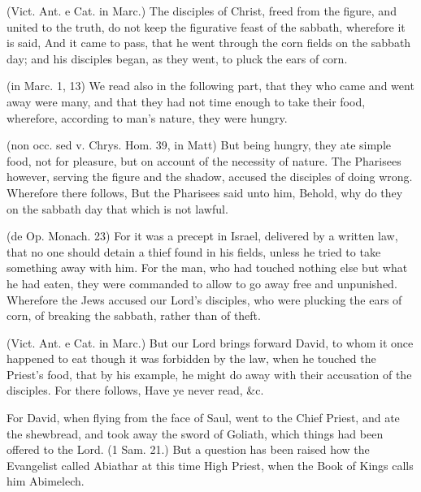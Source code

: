  (Vict. Ant. e Cat. in Marc.) The disciples of Christ, freed from the figure, and united to the truth, do not keep the figurative feast of the sabbath, wherefore it is said, And it came to pass, that he went through the corn fields on the sabbath day; and his disciples began, as they went, to pluck the ears of corn.

 (in Marc. 1, 13) We read also in the following part, that they who came and went away were many, and that they had not time enough to take their food, wherefore, according to man’s nature, they were hungry.

 (non occ. sed v. Chrys. Hom. 39, in Matt) But being hungry, they ate simple food, not for pleasure, but on account of the necessity of nature. The Pharisees however, serving the figure and the shadow, accused the disciples of doing wrong. Wherefore there follows, But the Pharisees said unto him, Behold, why do they on the sabbath day that which is not lawful.

 (de Op. Monach. 23) For it was a precept in Israel, delivered by a written law, that no one should detain a thief found in his fields, unless he tried to take something away with him. For the man, who had touched nothing else but what he had eaten, they were commanded to allow to go away free and unpunished. Wherefore the Jews accused our Lord’s disciples, who were plucking the ears of corn, of breaking the sabbath, rather than of theft.

 (Vict. Ant. e Cat. in Marc.) But our Lord brings forward David, to whom it once happened to eat though it was forbidden by the law, when he touched the Priest’s food, that by his example, he might do away with their accusation of the disciples. For there follows, Have ye never read, \&c.

 For David, when flying from the face of Saul, went to the Chief Priest, and ate the shewbread, and took away the sword of Goliath, which things had been offered to the Lord. (1 Sam. 21.) But a question has been raised how the Evangelist called Abiathar at this time High Priest, when the Book of Kings calls him Abimelech.

